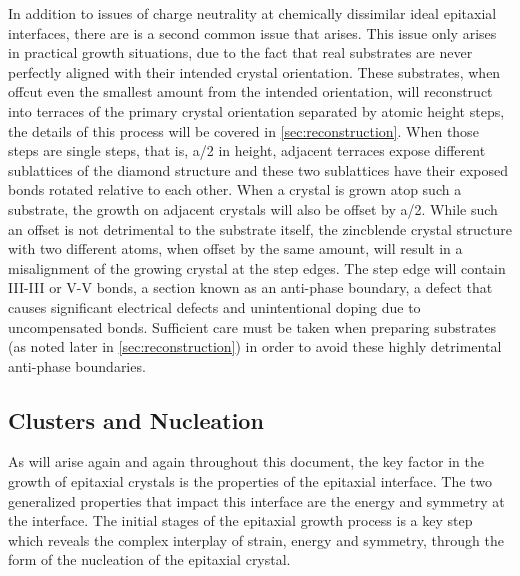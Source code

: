 In addition to issues of charge neutrality at chemically dissimilar ideal epitaxial interfaces, there are is a second common issue that arises. This issue only arises in practical growth situations, due to the fact that real substrates are never perfectly aligned with their intended crystal orientation. These substrates, when offcut even the smallest amount from the intended orientation, will reconstruct into terraces of the primary crystal orientation separated by atomic height steps, the details of this process will be covered in \cref{sec:reconstruction}. When those steps are single steps, that is, a/2 in height, adjacent terraces expose different sublattices of the diamond structure and these two sublattices have their exposed bonds rotated relative to each other. When a crystal is grown atop such a substrate, the growth on adjacent crystals will also be offset by a/2. While such an offset is not detrimental to the substrate itself, the zincblende crystal structure with two different atoms, when offset by the same amount, will result in a misalignment of the growing crystal at the step edges. The step edge will contain III-III or V-V bonds, a section known as an anti-phase boundary, a defect that causes significant electrical defects and unintentional doping due to uncompensated bonds. Sufficient care must be taken when preparing substrates (as noted later in \cref{sec:reconstruction}) in order to avoid these highly detrimental anti-phase boundaries.

\subsection{Clusters and Nucleation}
As will arise again and again throughout this document, the key factor in the growth of epitaxial crystals is the properties of the epitaxial interface. The two generalized properties that impact this interface are the energy and symmetry at the interface. The initial stages of the epitaxial growth process is a key step which reveals the complex interplay of strain, energy and symmetry, through the form of the nucleation of the epitaxial crystal.

